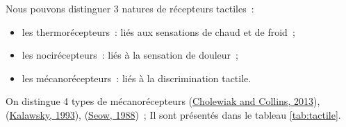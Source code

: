 \documentclass[
]{book}
\providecommand{\tightlist}{%
  \setlength{\itemsep}{0pt}\setlength{\parskip}{0pt}}
\begin{document}
Nous pouvons distinguer 3 natures de récepteurs tactiles~:

\begin{itemize}
\tightlist
\item
  les thermorécepteurs~: liés aux sensations de chaud et de froid~;
\item
  les nocirécepteurs~: liés à la sensation de douleur~;
\item
  les mécanorécepteurs~: liés à la discrimination tactile.
\end{itemize}

On distingue 4 types de mécanorécepteurs (\protect\hyperlink{ref-cholewiak2013sensory}{Cholewiak and Collins, 2013}),
(\protect\hyperlink{ref-kalawsky1993science}{Kalawsky, 1993}), (\protect\hyperlink{ref-seow1988physiology}{Seow, 1988})~; Il sont présentés dans le
tableau \ref{tab:tactile}.
\end{document}
